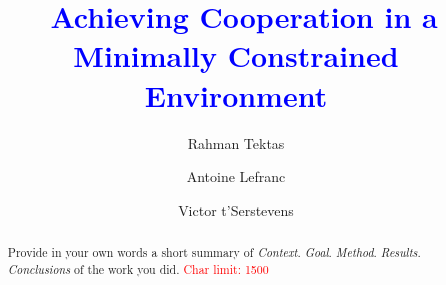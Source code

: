\documentclass[sigconf,nonacm]{acmart}
\newcommand{\todo}[1]{\textcolor{blue}{\ding{46}~#1}}
\begin{document}
\title{
	\todo{Achieving Cooperation in a Minimally Constrained Environment}
}

\author{Rahman Tektas}
 

\author{Antoine Lefranc}
 

\author{Victor t'Serstevens}
 


\begin{abstract}
Provide in your own words a short summary of 
\noindent \textit{Context}. 
\noindent \textit{Goal}. 
\noindent \textit{Method}. 
\noindent \textit{Results}. 
\noindent \textit{Conclusions} of the work you did.
\textcolor{red}{Char limit: 1500}
\end{abstract}

\maketitle




 


 



\end{document}

